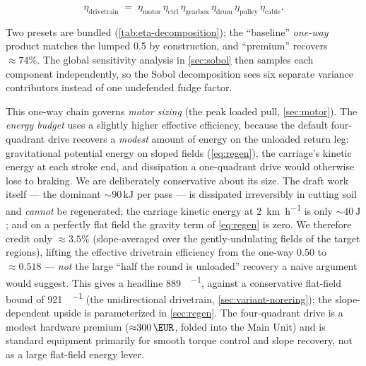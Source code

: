\documentclass[11pt,a4paper]{article}
\begin{document}
\begin{equation}\label{eq:eta-chain}
\eta_{\text{drivetrain}} \;=\; \eta_{\text{motor}} \,\eta_{\text{ctrl}}\, \eta_{\text{gearbox}} \,\eta_{\text{drum}}\, \eta_{\text{pulley}}\, \eta_{\text{cable}}.
\end{equation}

Two presets are bundled (\cref{tab:eta-decomposition}); the ``baseline'' \emph{one-way} product matches the lumped 0.5 by construction, and ``premium'' recovers ${\approx}74\%$. The global sensitivity analysis in \cref{sec:sobol} then samples each component independently, so the Sobol decomposition sees six separate variance contributors instead of one undefended fudge factor.

This one-way chain governs \emph{motor sizing} (the peak loaded pull, \cref{sec:motor}). The \emph{energy budget} uses a slightly higher effective efficiency, because the default four-quadrant drive recovers a \emph{modest} amount of energy on the unloaded return leg: gravitational potential energy on sloped fields (\cref{eq:regen}), the carriage's kinetic energy at each stroke end, and dissipation a one-quadrant drive would otherwise lose to braking. We are deliberately conservative about its size. The draft work itself --- the dominant ${\sim}90\,\si{\kilo\joule}$ per pass --- is dissipated irreversibly in cutting soil and \emph{cannot} be regenerated; the carriage kinetic energy at \SI{2}{\kilo\meter\per\hour} is only ${\sim}\SI{40}{\joule}$; and on a perfectly flat field the gravity term of \cref{eq:regen} is zero. We therefore credit only ${\approx}3.5\%$ (slope-averaged over the gently-undulating fields of the target regions), lifting the effective drivetrain efficiency from the one-way 0.50 to ${\approx}0.518$ --- \emph{not} the large ``half the round is unloaded'' recovery a naive argument would suggest. This gives a headline \SI{889}{\Wh\per\decare}, against a conservative flat-field bound of \SI{921}{\Wh\per\decare} (the unidirectional drivetrain, \cref{sec:variant-norering}); the slope-dependent upside is parameterized in \cref{sec:regen}. The four-quadrant drive is a modest hardware premium (${\approx}\SI{300}{\EUR}$, folded into the Main Unit) and is standard equipment primarily for smooth torque control and slope recovery, not as a large flat-field energy lever.
\end{document}
